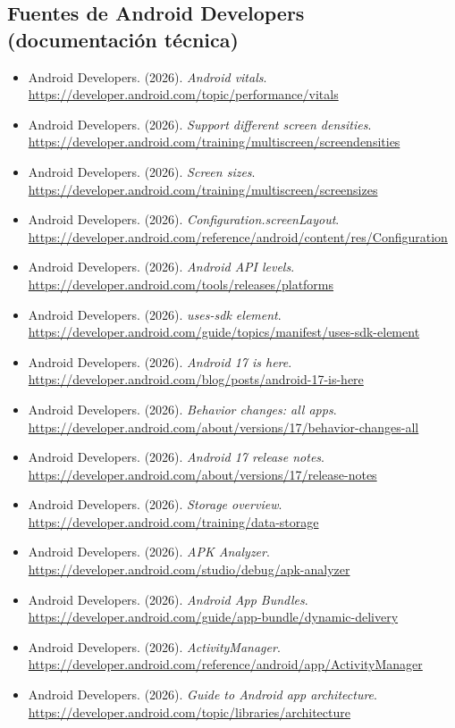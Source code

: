 \subsection*{Fuentes de Android Developers (documentación técnica)}
{\small
\begin{itemize}[leftmargin=*,itemsep=0.1em,label={}]
  \item Android Developers. (2026). \emph{Android vitals}. \url{https://developer.android.com/topic/performance/vitals}
  \item Android Developers. (2026). \emph{Support different screen densities}. \url{https://developer.android.com/training/multiscreen/screendensities}
  \item Android Developers. (2026). \emph{Screen sizes}. \url{https://developer.android.com/training/multiscreen/screensizes}
  \item Android Developers. (2026). \emph{Configuration.screenLayout}. \url{https://developer.android.com/reference/android/content/res/Configuration}
  \item Android Developers. (2026). \emph{Android API levels}. \url{https://developer.android.com/tools/releases/platforms}
  \item Android Developers. (2026). \emph{uses-sdk element}. \url{https://developer.android.com/guide/topics/manifest/uses-sdk-element}
  \item Android Developers. (2026). \emph{Android 17 is here}. \url{https://developer.android.com/blog/posts/android-17-is-here}
  \item Android Developers. (2026). \emph{Behavior changes: all apps}. \url{https://developer.android.com/about/versions/17/behavior-changes-all}
  \item Android Developers. (2026). \emph{Android 17 release notes}. \url{https://developer.android.com/about/versions/17/release-notes}
  \item Android Developers. (2026). \emph{Storage overview}. \url{https://developer.android.com/training/data-storage}
  \item Android Developers. (2026). \emph{APK Analyzer}. \url{https://developer.android.com/studio/debug/apk-analyzer}
  \item Android Developers. (2026). \emph{Android App Bundles}. \url{https://developer.android.com/guide/app-bundle/dynamic-delivery}
  \item Android Developers. (2026). \emph{ActivityManager}. \url{https://developer.android.com/reference/android/app/ActivityManager}
  \item Android Developers. (2026). \emph{Guide to Android app architecture}. \url{https://developer.android.com/topic/libraries/architecture}

\end{itemize}}
